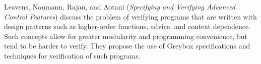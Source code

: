 


Leavens, Naumann, Rajan, and Aotani
\cite{isola-2016-leavens}
({\em Specifying and Verifying Advanced Control Features})
discuss the problem of verifying programs that are written with design patterns such as higher-order functions, advice, and context dependence. Such concepts allow for greater modularity and programming convenience, but tend to be harder to verify. They propose the use of Greybox specifications and techniques for verification of such programs. 

